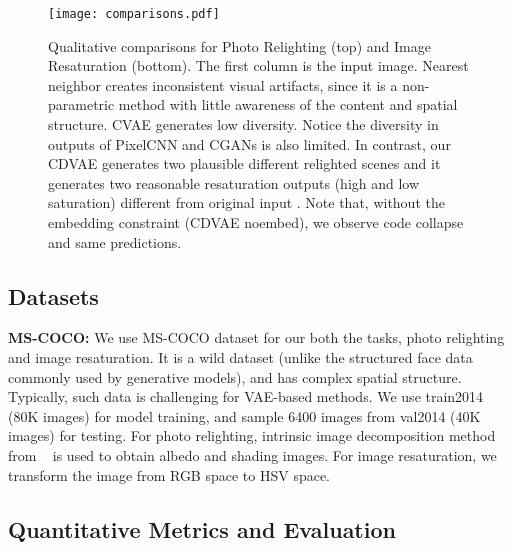 \documentclass[10pt,twocolumn,letterpaper]{article}
\begin{document}
\begin{figure*}[ht]
\centerline{  \texttt{[image: comparisons.pdf]}}
  \caption{Qualitative comparisons for Photo Relighting (top) and Image Resaturation (bottom). The first column is the input image. 
  Nearest neighbor creates inconsistent visual artifacts, since it is a non-parametric method with little awareness
  of the content and spatial structure. CVAE generates low diversity. Notice the diversity in outputs of PixelCNN
  and CGANs is also limited. In contrast, our CDVAE generates two plausible different relighted scenes and it 
  generates two reasonable resaturation outputs (high and low saturation) different from original input . Note that, 
  without the embedding constraint (CDVAE noembed), we observe code collapse and same predictions.}
  \label{fig:cmp}
\end{figure*}


\subsection{Datasets}
\label{sec:data}

\textbf{MS-COCO: } We use MS-COCO dataset for our both the tasks, photo relighting and image resaturation. It is a wild 
dataset (unlike the structured face data commonly used by generative models), and has complex spatial structure. 
Typically, such data is challenging for VAE-based methods. We use train2014 (80K images) for model training, and 
sample 6400 images from val2014 (40K images) for testing. For photo relighting, intrinsic image decomposition method from ~\cite{Bell:2014} 
is used to obtain albedo and shading images. For image resaturation, we transform the image from RGB space to HSV space. 

\subsection{Quantitative Metrics and Evaluation}
\label{sec:quant}

\end{document}
